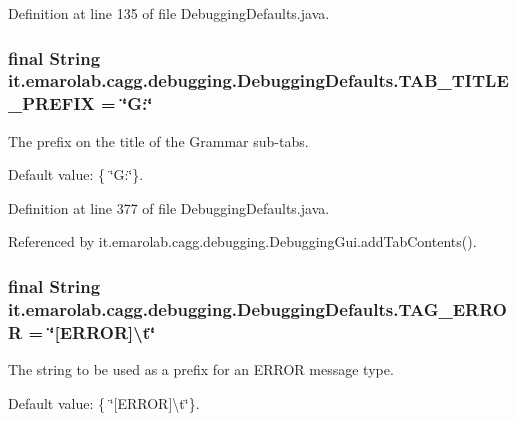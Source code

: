 Definition at line 135 of file Debugging\-Defaults.\-java.

\hypertarget{classit_1_1emarolab_1_1cagg_1_1debugging_1_1DebuggingDefaults_af1e0a6e8862bb7cf68f452b0e83ef0e7}{
\subsubsection[{T\-A\-B\-\_\-\-T\-I\-T\-L\-E\-\_\-\-P\-R\-E\-F\-I\-X}]{\setlength{\rightskip}{0pt plus 5cm}final String it.\-emarolab.\-cagg.\-debugging.\-Debugging\-Defaults.\-T\-A\-B\-\_\-\-T\-I\-T\-L\-E\-\_\-\-P\-R\-E\-F\-I\-X = \char`\"{}G\-:\char`\"{}\hspace{0.3cm}{\ttfamily [static]}}}\label{classit_1_1emarolab_1_1cagg_1_1debugging_1_1DebuggingDefaults_af1e0a6e8862bb7cf68f452b0e83ef0e7}
The prefix on the title of the Grammar sub-\/tabs.\par
 Default value\-: \{ \char`\"{}\-G\-:\char`\"{}\}. 

Definition at line 377 of file Debugging\-Defaults.\-java.



Referenced by it.\-emarolab.\-cagg.\-debugging.\-Debugging\-Gui.\-add\-Tab\-Contents().

\hypertarget{classit_1_1emarolab_1_1cagg_1_1debugging_1_1DebuggingDefaults_a573cd0445233309d6c021ddf46e23f7f}{
\subsubsection[{T\-A\-G\-\_\-\-E\-R\-R\-O\-R}]{\setlength{\rightskip}{0pt plus 5cm}final String it.\-emarolab.\-cagg.\-debugging.\-Debugging\-Defaults.\-T\-A\-G\-\_\-\-E\-R\-R\-O\-R = \char`\"{}\mbox{[}E\-R\-R\-O\-R\mbox{]}\textbackslash{}t\char`\"{}\hspace{0.3cm}{\ttfamily [static]}}}\label{classit_1_1emarolab_1_1cagg_1_1debugging_1_1DebuggingDefaults_a573cd0445233309d6c021ddf46e23f7f}
The string to be used as a prefix for an E\-R\-R\-O\-R message type.\par
 Default value\-: \{ \char`\"{}\mbox{[}\-E\-R\-R\-O\-R\mbox{]}\textbackslash{}t\char`\"{}\}. 

